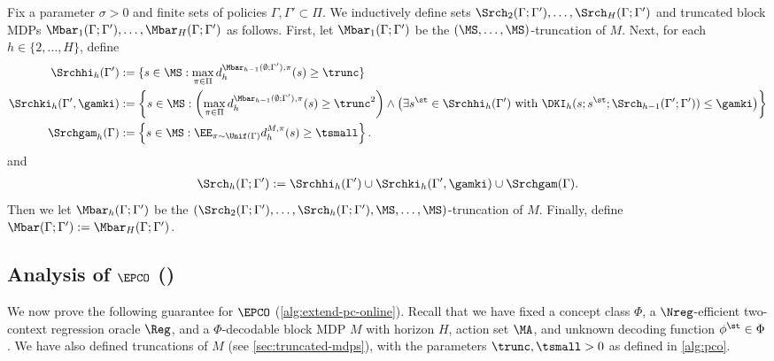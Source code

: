 Fix a parameter $\sigma > 0$ and finite sets of policies $\Gamma,\Gamma' \subset \Pi$. We inductively define sets $\Srch_2(\Gamma;\Gamma'),\dots,\Srch_H(\Gamma;\Gamma')$ and truncated block MDPs $\Mbar_1(\Gamma;\Gamma'),\dots,\Mbar_H(\Gamma;\Gamma')$ as follows. First, let $\Mbar_1(\Gamma;\Gamma')$ be the $(\MS,\dots,\MS)$-truncation of $M$. Next, for each $h \in \{2,\dots,H\}$, define 
\begin{align*}
\Srchhi_h(\Gamma') &:= \{s \in \MS: \max_{\pi\in\Pi} d^{\Mbar_{h-1}(\emptyset;\Gamma'), \pi}_h(s) \geq \trunc\} \\ 
\Srchki_h(\Gamma',\gamki) &:= \left\{s \in \MS: \left(\max_{\pi\in\Pi} d^{\Mbar_{h-1}(\emptyset;\Gamma'), \pi}_h(s) \geq \trunc^2\right) \land \left(\exists s^\st \in \Srchhi_h(\Gamma') \text{ with } \DKI_h(s;s^\st;\Srch_{h-1}(\Gamma';\Gamma')) \leq \gamki\right)\right\} \\ 
\Srchgam_h(\Gamma) &:= \left\{s \in \MS: \EE_{\pi\sim\Unif(\Gamma)} d^{M,\pi}_h(s) \geq \tsmall\right\}.
\end{align*}
and 
\begin{align*}
\Srch_h(\Gamma;\Gamma') := \Srchhi_h(\Gamma') \cup \Srchki_h(\Gamma',\gamki) \cup \Srchgam(\Gamma).
\end{align*}
Then we let $\Mbar_h(\Gamma;\Gamma')$ be the $(\Srch_2(\Gamma;\Gamma'),\dots,\Srch_h(\Gamma;\Gamma'),\MS,\dots,\MS)$-truncation of $M$. Finally, define $\Mbar(\Gamma;\Gamma') := \Mbar_H(\Gamma;\Gamma')$.
\fi
\subsection{Analysis of $\EPCO$ ()}\label{subsec:epco}

We now prove the following guarantee for $\EPCO$ (\cref{alg:extend-pc-online}). Recall that we have fixed a concept class $\Phi$, a $\Nreg$-efficient two-context regression oracle $\Reg$, and a $\Phi$-decodable block MDP $M$ with horizon $H$, action set $\MA$, and unknown decoding function $\phi^\st \in \Phi$. We have also defined truncations of $M$ (see \cref{sec:truncated-mdps}), with the parameters $\trunc,\tsmall>0$ as defined in \cref{alg:pco}.

